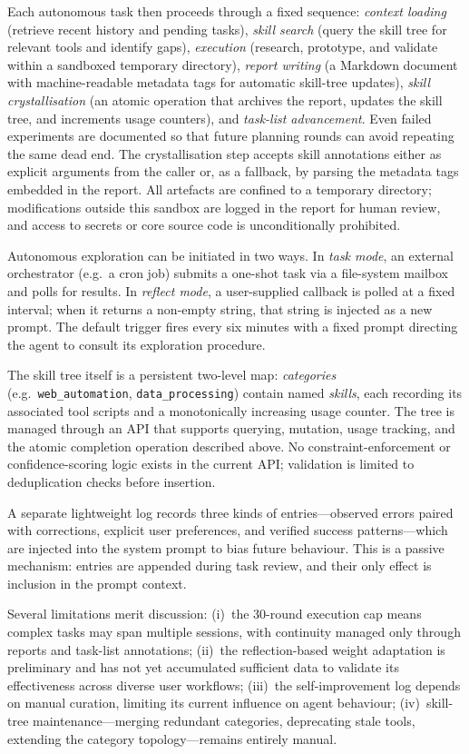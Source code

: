 Each autonomous task then proceeds through a fixed sequence:
\emph{context loading} (retrieve recent history and pending tasks),
\emph{skill search} (query the skill tree for relevant tools and
identify gaps),
\emph{execution} (research, prototype, and validate within a
sandboxed temporary directory),
\emph{report writing} (a Markdown document with machine-readable
metadata tags for automatic skill-tree updates),
\emph{skill crystallisation} (an atomic operation that archives the
report, updates the skill tree, and increments usage counters), and
\emph{task-list advancement}.
Even failed experiments are documented so that future planning rounds
can avoid repeating the same dead end.  The crystallisation step
accepts skill annotations either as explicit arguments from the
caller or, as a fallback, by parsing the metadata tags embedded in
the report.  All artefacts are confined to a temporary directory;
modifications outside this sandbox are logged in the report for human
review, and access to secrets or core source code is unconditionally
prohibited.

Autonomous exploration can be initiated in two ways.  In
\emph{task mode}, an external orchestrator (e.g.\ a cron job)
submits a one-shot task via a file-system mailbox and polls for
results.  In \emph{reflect mode}, a user-supplied callback is polled
at a fixed interval; when it returns a non-empty string, that string
is injected as a new prompt.  The default trigger fires every six
minutes with a fixed prompt directing the agent to consult its
exploration procedure.

The skill tree itself is a persistent two-level map: \emph{categories}
(e.g.\ \texttt{web\_automation}, \texttt{data\_processing}) contain
named \emph{skills}, each recording its associated tool scripts and a
monotonically increasing usage counter.  The tree is managed through
an API that supports querying, mutation, usage tracking, and the
atomic completion operation described above.  No
constraint-enforcement or confidence-scoring logic exists in the
current API; validation is limited to deduplication checks before
insertion.

A separate lightweight log records three kinds of entries---observed
errors paired with corrections, explicit user preferences, and
verified success patterns---which are injected into the system prompt
to bias future behaviour.  This is a passive mechanism: entries are
appended during task review, and their only effect is inclusion in
the prompt context.

Several limitations merit discussion:
(i)~the 30-round execution cap means complex tasks may span multiple
sessions, with continuity managed only through reports and task-list
annotations;
(ii)~the reflection-based weight adaptation is preliminary and has not
yet accumulated sufficient data to validate its effectiveness across
diverse user workflows;
(iii)~the self-improvement log depends on manual curation, limiting
its current influence on agent behaviour;
(iv)~skill-tree maintenance---merging redundant categories,
deprecating stale tools, extending the category topology---remains
entirely manual.

